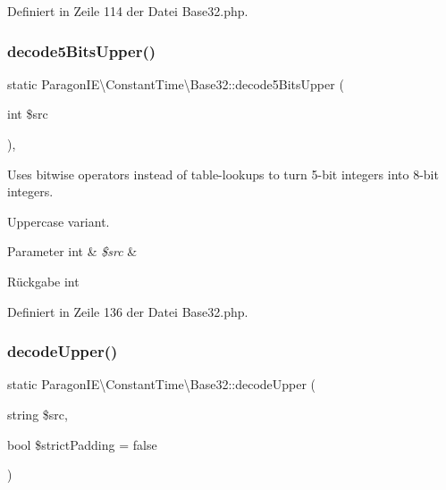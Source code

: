 Definiert in Zeile 114 der Datei Base32.\+php.

\mbox{\label{class_paragon_i_e_1_1_constant_time_1_1_base32_a136d63488f57c44b94d573dc7f047fd9}} 
\subsubsection{\texorpdfstring{decode5\+Bits\+Upper()}{decode5BitsUpper()}}
{\footnotesize\ttfamily static Paragon\+I\+E\textbackslash{}\+Constant\+Time\textbackslash{}\+Base32\+::decode5\+Bits\+Upper (\begin{DoxyParamCaption}\item[{int}]{\$src }\end{DoxyParamCaption})\hspace{0.3cm}{\ttfamily [static]}, {\ttfamily [protected]}}

Uses bitwise operators instead of table-\/lookups to turn 5-\/bit integers into 8-\/bit integers.

Uppercase variant.


\begin{DoxyParams}[1]{Parameter}
int & {\em \$src} & \\
\hline
\end{DoxyParams}
\begin{DoxyReturn}{Rückgabe}
int 
\end{DoxyReturn}


Definiert in Zeile 136 der Datei Base32.\+php.

\mbox{\label{class_paragon_i_e_1_1_constant_time_1_1_base32_afc291be096a3ad6bff476416daacedfa}} 
\subsubsection{\texorpdfstring{decode\+Upper()}{decodeUpper()}}
{\footnotesize\ttfamily static Paragon\+I\+E\textbackslash{}\+Constant\+Time\textbackslash{}\+Base32\+::decode\+Upper (\begin{DoxyParamCaption}\item[{string}]{\$src,  }\item[{bool}]{\$strict\+Padding = {\ttfamily false} }\end{DoxyParamCaption})\hspace{0.3cm}{\ttfamily [static]}}

